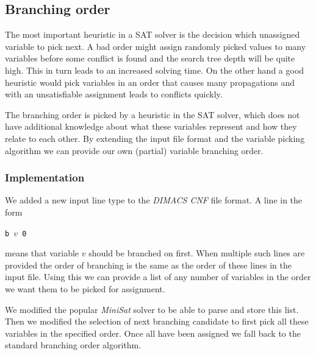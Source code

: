 

\subsection{Branching order}
\label{sec:branching-order}

The most important heuristic in a SAT solver is the decision which unassigned variable to pick next.
A bad order might assign randomly picked values to many variables before some conflict is found and the search tree depth will be quite high.
This in turn leads to an increased solving time.
On the other hand a good heuristic would pick variables in an order that causes many propagations and with an unsatisfiable assignment leads to conflicts quickly.

The branching order is picked by a heuristic in the SAT solver, which does not have additional knowledge about what these variables represent and how they relate to each other.
By extending the input file format and the variable picking algorithm we can provide our own (partial) variable branching order.

\subsubsection{Implementation}

We added a new input line type to the \emph{DIMACS CNF} file format.
A line in the form

\centerline{\texttt{b $v$ 0}}

\noindent means that variable $v$ should be branched on first.
When multiple such lines are provided the order of branching is the same as the order of these lines in the input file.
Using this we can provide a list of any number of variables in the order we want them to be picked for assignment.

We modified the popular \emph{MiniSat} solver to be able to parse and store this list.
Then we modified the selection of next branching candidate to first pick all these variables in the specified order.
Once all have been assigned we fall back to the standard branching order algorithm.


